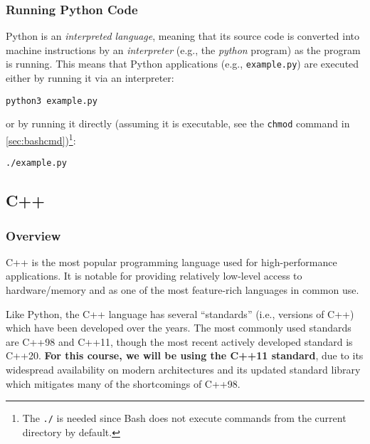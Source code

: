 \documentclass[12pt]{article}
\begin{document}
\subsubsection{Running Python Code}
Python is an \emph{interpreted language}, meaning that its source code is converted into machine instructions by an \emph{interpreter} (e.g., the \emph{python} program) as the program is running. This means that Python applications (e.g., \texttt{example.py}) are executed either by running it via an interpreter:
\begin{verbatim}
python3 example.py
\end{verbatim}
or by running it directly (assuming it is executable, see the \texttt{chmod} command in \ref{sec:bashcmd})\footnote{The \texttt{./} is needed since Bash does not execute commands from the current directory by default.}:
\begin{verbatim}
./example.py
\end{verbatim}



\subsection{C++}
\subsubsection{Overview}
C++ is the most popular programming language used for high-performance applications. It is notable for providing relatively low-level access to hardware/memory and as one of the most feature-rich languages in common use.

Like Python, the C++ language has several ``standards'' (i.e., versions of C++) which have been developed over the years. The most commonly used standards are C++98 and C++11, though the most recent actively developed standard is C++20. \textbf{For this course, we will be using the C++11 standard}, due to its widespread availability on modern architectures and its updated standard library which mitigates many of the shortcomings of C++98.
\end{document}
